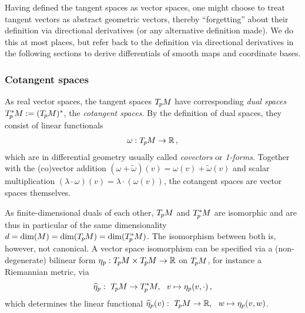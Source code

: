 Having defined the tangent spaces as vector spaces, one might choose to treat tangent vectors as abstract geometric vectors, thereby ``forgetting'' about their definition via directional derivatives (or any alternative definition made).
We do this at most places, but refer back to the definition via directional derivatives in the following sections to derive differentials of smooth maps and coordinate bases.



\subsubsection{Cotangent spaces}
\label{apx:cotangent_spaces}
As real vector spaces, the tangent spaces $T_{\mkern-1.5mu p}\mkern-.5muM$ have corresponding \emph{dual spaces} $T_{\mkern-1.5mu p}^{\mkern-0mu *}\mkern-1muM := (T_{\mkern-1.5mu p}\mkern-.5muM)^*$, the \emph{cotangent spaces}.
By the definition of dual spaces, they consist of linear functionals
\begin{align}
    \omega: T_{\mkern-1.5mu p}\mkern-.5muM \to \mathbb{R} \,,
\end{align}
which are in differential geometry usually called \emph{covectors} or \emph{1-forms}.
Together with the (co)vector addition
$(\omega + \widetilde{\omega})(v) = \omega(v) + \widetilde{\omega}(v)$
and scalar multiplication 
$(\lambda \cdot \omega)(v) = \lambda\cdot (\omega(v))$,
the cotangent spaces are vector spaces themselves.

As finite-dimensional duals of each other, $T_{\mkern-1.5mu p}\mkern-.5muM$  and $T_{\mkern-1.5mu p}^{\mkern-0mu *}\mkern-1muM$ are isomorphic and are thus in particular of the same dimensionality $d = \dim(M) = \dim(T_{\mkern-1.5mu p}\mkern-.5muM) = \dim(T_{\mkern-1.5mu p}^{\mkern-0mu *}\mkern-1muM)$.
The isomorphism between both is, however, not canonical.
A vector space isomorphism can be specified via a (non-degenerate) bilinear form $\eta_p: T_{\mkern-1.5mu p}\mkern-.5muM \times T_{\mkern-1.5mu p}\mkern-.5muM \to \mathbb{R}$ on $T_{\mkern-1.5mu p}\mkern-.5muM$, for instance a Riemannian metric, via
\begin{align}
    \widehat{\eta}_p:\ T_{\mkern-1.5mu p}\mkern-.5muM \to T_{\mkern-1.5mu p}^{\mkern-0mu *}\mkern-1muM,\ \ v \mapsto \eta_p(v, \cdot) \,,
\end{align}
which determines the linear functional
$\widehat{\eta}_p(v):\ T_{\mkern-1.5mu p}\mkern-.5muM \to \mathbb{R},\ \ w \mapsto \eta_p(v, w)$.



